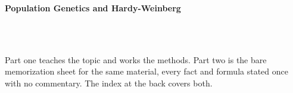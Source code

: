 



\makeindex[title={Index of This Volume},columns=2,intoc]

\begin{titlepage}\thispagestyle{empty}
\vspace*{0.14\textheight}
\noindent{\color{tiercore}\rule{\textwidth}{5pt}}\\[3pt]
\noindent{\color{bioline}\rule{\textwidth}{1pt}}\\[26pt]
\\[12pt]
\noindent\begin{minipage}{\textwidth}\raggedright
{\sffamily\bfseries\fontsize{28}{32}\selectfont\color{bioink}%
 \hyphenchar{} Population Genetics and Hardy-Weinberg\par}\end{minipage}\\[16pt]
\noindent{\color{biogreen}\rule{\textwidth}{1.4pt}}\\[10pt]
\noindent\begin{minipage}{\textwidth}\raggedright
{\fontsize{10.5}{14}\selectfont\color{biogreen}%
Part one teaches the topic and works the methods. Part two is the bare memorization sheet for the
same material, every fact and formula stated once with no commentary. The index at the back covers both.\par}\end{minipage}
\vfill
\noindent{\color{bioline}\rule{\textwidth}{1pt}}\\[3pt]
\noindent{\color{tiercore}\rule{\textwidth}{5pt}}
\end{titlepage}
\tableofcontents
\clearpage
{}
\clearpage
\printindex

